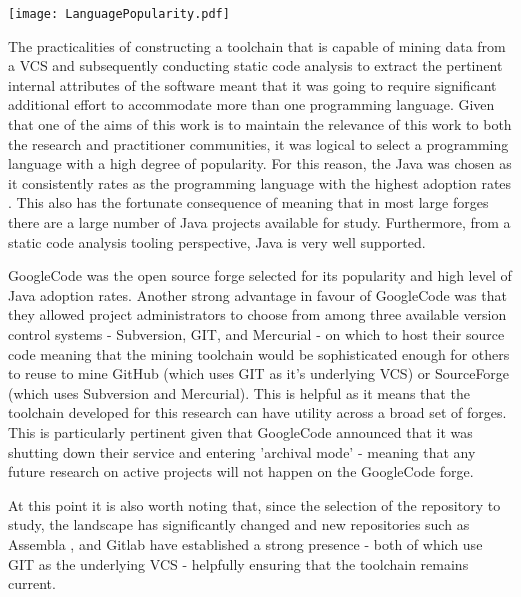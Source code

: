 \begin{table}
\centering 
{}
\begin{tabular}
 \centering 
 \texttt{[image: LanguagePopularity.pdf]}
 \label{tab:LanguagePopularity}
\end{tabular}
\end{table}


The practicalities of constructing a toolchain that is capable of mining data from a VCS and subsequently conducting static code analysis to extract the pertinent internal attributes of the software meant that it was going to require significant additional effort to accommodate more than one programming language. Given that one of the aims of this work is to maintain the relevance of this work to both the research and practitioner communities, it was logical to select a programming language with a high degree of popularity. For this reason, the Java was chosen as it consistently rates as the programming language with the highest adoption rates \citep{tiobe2017}. This also has the fortunate consequence of meaning that in most large forges there are a large number of Java projects available for study.  Furthermore, from a static code analysis tooling perspective, Java is very well supported.

GoogleCode was the open source forge selected for its popularity and high level of Java adoption rates. Another strong advantage in favour of GoogleCode was that they allowed project administrators to choose from among three available version control systems - Subversion, GIT, and Mercurial - on which to host their source code meaning that the mining toolchain would be sophisticated enough for others to reuse to mine GitHub (which uses GIT as it's underlying VCS) or SourceForge (which uses Subversion and Mercurial). This is helpful as it means that the toolchain developed for this research can have utility across a broad set of forges. This is particularly pertinent given that GoogleCode announced that it was shutting down their service and entering 'archival mode' - meaning that any future research on active projects will not happen on the GoogleCode forge. 

At this point it is also worth noting that, since the selection of the repository to study, the landscape has significantly changed and new repositories such as Assembla \citep{assembla}, and Gitlab \citep{gitlab} have established a strong presence - both of which use GIT as the underlying VCS - helpfully ensuring that the toolchain remains current.

